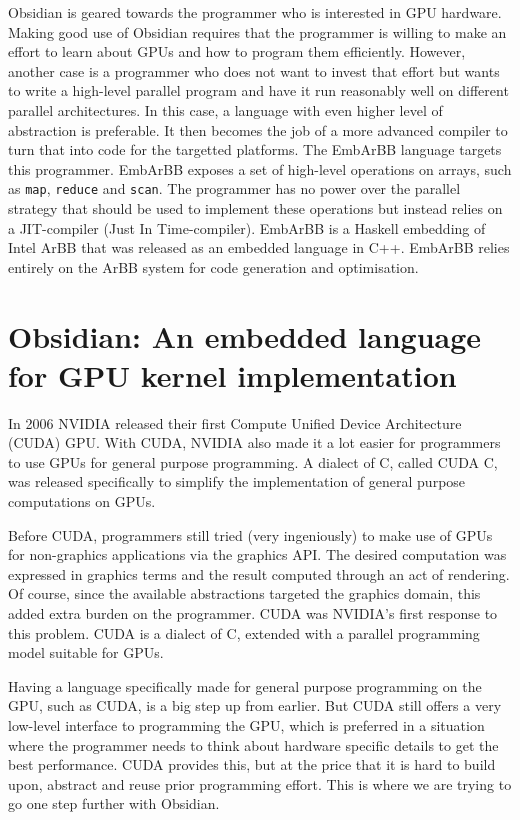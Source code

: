 \documentclass[a4paper]{book}
\begin{document}
Obsidian is geared towards the programmer who is interested in GPU hardware. Making 
good use of Obsidian requires that the programmer is willing to make an effort 
to learn about GPUs and how to program them efficiently. However, another case 
is a programmer who does not want to invest that effort but wants to write a high-level 
parallel program and have it run reasonably well on different parallel architectures. 
In this case, a language with even higher level of abstraction is preferable. It then 
becomes the job of a more advanced compiler to turn that into code for the targetted 
platforms. The EmbArBB language targets this programmer. EmbArBB exposes a set of high-level 
operations on arrays, such as {\tt map}, {\tt reduce} and {\tt scan}. The programmer 
has no power over the parallel strategy that should be used to implement these 
operations but instead relies on a JIT-compiler (Just In Time-compiler). EmbArBB is a 
Haskell embedding of Intel ArBB that was released as an embedded language in C++. 
EmbArBB relies entirely on the ArBB system for code generation and optimisation.  


\section {Obsidian: An embedded language for GPU kernel implementation} 

In 2006 NVIDIA released their first Compute Unified Device Architecture (CUDA) 
GPU. With CUDA, NVIDIA also made it a lot easier for programmers to use GPUs
for general purpose programming. A dialect of C, called CUDA C, was released 
specifically to simplify the implementation of general purpose computations on GPUs. 

Before CUDA, programmers still tried (very ingeniously) to make use of GPUs for 
non-graphics applications via the graphics API. The desired computation was expressed 
in graphics terms and the result computed through an act of rendering. Of course, since the 
available abstractions targeted the graphics domain, this added extra
burden on the programmer. CUDA was NVIDIA's first response to this problem. CUDA 
is a dialect of C, extended with a parallel programming model suitable for GPUs. 

Having a language specifically made for general purpose programming on the GPU, such as 
CUDA, is a big step up from earlier. But CUDA still offers a very low-level interface to 
programming the GPU, which is preferred in a situation where the programmer needs to 
think about hardware specific details to get the best performance. CUDA provides this, 
but at the price that it is hard to build upon, abstract and reuse prior programming 
effort. This is where we are trying to go one step further with Obsidian. 
\end{document}
